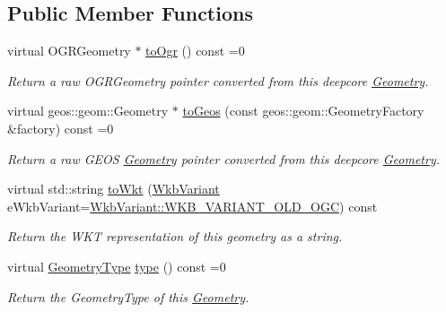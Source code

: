 \subsection*{Public Member Functions}
\begin{DoxyCompactItemize}
\item 
virtual O\+G\+R\+Geometry $\ast$ \hyperlink{group___geometry_module_ga4ed7d864786c327184cd103ea068ced2}{to\+Ogr} () const =0
\begin{DoxyCompactList}\small\item\em Return a raw O\+G\+R\+Geometry pointer converted from this deepcore \hyperlink{structdg_1_1deepcore_1_1geometry_1_1_geometry}{Geometry}. \end{DoxyCompactList}\item 
virtual geos\+::geom\+::\+Geometry $\ast$ \hyperlink{group___geometry_module_ga9442b08cc58475d6f2f7060cc9cd8a7f}{to\+Geos} (const geos\+::geom\+::\+Geometry\+Factory \&factory) const =0
\begin{DoxyCompactList}\small\item\em Return a raw G\+E\+OS \hyperlink{structdg_1_1deepcore_1_1geometry_1_1_geometry}{Geometry} pointer converted from this deepcore \hyperlink{structdg_1_1deepcore_1_1geometry_1_1_geometry}{Geometry}. \end{DoxyCompactList}\item 
virtual std\+::string \hyperlink{group___geometry_module_gacfdc0f5010d3cf254f9ab5705a5741d9}{to\+Wkt} (\hyperlink{group___geometry_module_gadf5f1b06bc7a4ba83b704f3e65881d2a}{Wkb\+Variant} e\+Wkb\+Variant=\hyperlink{group___geometry_module_ggadf5f1b06bc7a4ba83b704f3e65881d2aae3f737e6dff286ac873e5570cb43d013}{Wkb\+Variant\+::\+W\+K\+B\+\_\+\+V\+A\+R\+I\+A\+N\+T\+\_\+\+O\+L\+D\+\_\+\+O\+GC}) const 
\begin{DoxyCompactList}\small\item\em Return the W\+KT representation of this geometry as a string. \end{DoxyCompactList}\item 
virtual \hyperlink{group___geometry_module_gad9a3ec0b998629dbcf8274512700964a}{Geometry\+Type} \hyperlink{group___geometry_module_gacdfc02ad835493ef40a398bdf24e30a1}{type} () const =0
\begin{DoxyCompactList}\small\item\em Return the Geometry\+Type of this \hyperlink{structdg_1_1deepcore_1_1geometry_1_1_geometry}{Geometry}. \end{DoxyCompactList}\item 

\end{DoxyCompactItemize}
